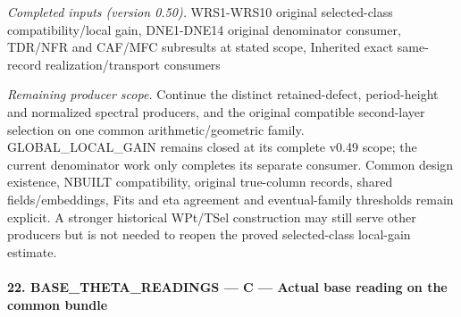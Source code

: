 \documentclass[11pt,a4paper]{article}
\numberwithin{equation}{section}
\theoremstyle{remark}\newtheorem{remark}[theorem]{Remark}
\begin{document}
\emph{Completed inputs (version 0.50).} WRS1-WRS10 original selected-class compatibility/local gain, DNE1-DNE14 original denominator consumer, TDR/NFR and CAF/MFC subresults at stated scope, Inherited exact same-record realization/transport consumers

\emph{Remaining producer scope.} Continue the distinct retained-defect, period-height and normalized spectral producers, and the original compatible second-layer selection on one common arithmetic/geometric family. GLOBAL\_\allowbreak LOCAL\_\allowbreak GAIN remains closed at its complete v0.49 scope; the current denominator work only completes its separate consumer. Common design existence, NBUILT compatibility, original true-column records, shared fields/embeddings, Fits and eta agreement and eventual-family thresholds remain explicit. A stronger historical WPt/TSel construction may still serve other producers but is not needed to reopen the proved selected-class local-gain estimate.



\paragraph{22. BASE\_\allowbreak THETA\_\allowbreak READINGS — C — Actual base reading on the common bundle}
\end{document}
